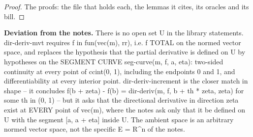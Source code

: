%
\begin{proof}
%
The proofs: the file that holds each, the lemmas it cites, its oracles and its bill.
%
%
%
%
%
%
%
%
%
\end{proof}
%
\noindent\textbf{Deviation from the notes.} There is no open set U in the library statements. dir-deriv-mvt requires f in fun(vec(m), rr), i.e. f TOTAL on the normed vector space, and replaces the hypothesis that the partial derivative is defined on U by hypotheses on the SEGMENT CURVE seg-curve(m, f, a, eta): two-sided continuity at every point of ccint(0, 1), including the endpoints 0 and 1, and differentiability at every interior point. dir-deriv-increment is the closer match in shape -- it concludes f(b + zeta) - f(b) = dir-deriv(m, f, b + th * zeta, zeta) for some th in (0, 1) -- but it asks that the directional derivative in direction zeta exist at EVERY point of vec(m), where the notes ask only that it be defined on U with the segment [a, a + eta] inside U. The ambient space is an arbitrary normed vector space, not the specific E = R\textasciicircum{}n of the notes.
%
\renewcommand{\thethm}{2.25}
\begin{lem}\label{thm:dir-deriv-homogeneous}
%
%
\end{lem}
